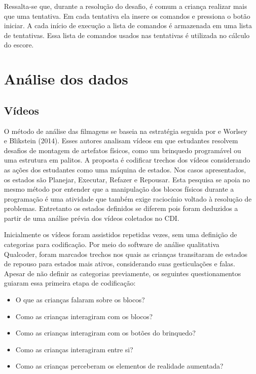 Ressalta-se que, durante a resolução do desafio, é comum a criança realizar mais que uma tentativa. Em cada tentativa ela insere os comandos e pressiona o botão iniciar. A cada início de execução a lista de comandos é armazenada em uma lista de tentativas. Essa lista de comandos usados nas tentativas é utilizada no cálculo do escore.

\section{Análise dos dados}
\subsection{Vídeos}
O método de análise das filmagens se baseia na estratégia seguida por  e Worlsey e Blikstein (2014). Esses autores analisam vídeos em que estudantes resolvem desafios de montagem de artefatos físicos, como um brinquedo programável ou uma estrutura em palitos. A proposta é codificar trechos dos vídeos considerando as ações dos estudantes como uma máquina de estados. Nos casos apresentados, os estados são Planejar, Executar, Refazer e Repousar. Esta pesquisa se apoia no mesmo método por entender que a manipulação dos blocos físicos durante a programação é uma atividade que também exige raciocínio voltado à resolução de problemas. Entretanto os estados definidos se diferem pois foram deduzidos a partir de uma análise prévia dos vídeos coletados no CDI.

Inicialmente os vídeos foram assistidos repetidas vezes, sem uma definição de categorias para codificação. Por meio do software de análise qualitativa Qualcoder, foram marcados trechos nos quais as crianças transitaram de estados de repouso para estados mais ativos, considerando suas gesticulações e falas. Apesar de não definir as categorias previamente, os seguintes questionamentos guiaram essa primeira etapa de codificação:

\begin{itemize}
    \item O que as crianças falaram sobre os blocos?
    \item Como as crianças interagiram com os blocos?
    \item Como as crianças interagiram com os botões do brinquedo?
    \item Como as crianças interagiram entre si?
    \item Como as crianças perceberam os elementos de realidade aumentada?
\end{itemize}





